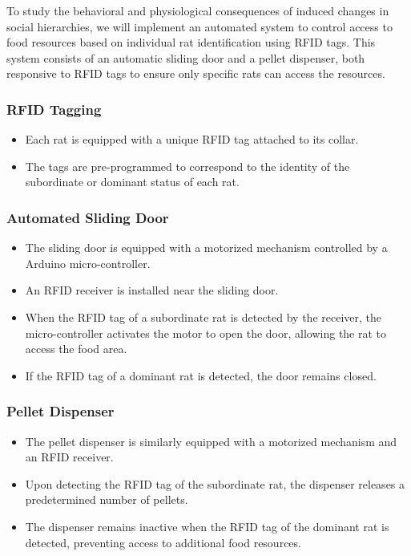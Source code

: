 \documentclass[english, a4paper, 11pt]{article}
\begin{document}
To study the behavioral and physiological consequences of induced changes in social hierarchies, we will implement an automated system to control access to food resources based on individual rat identification using RFID tags\cite{habedankMouseWhereArt2020}. This system consists of an automatic sliding door and a pellet dispenser, both responsive to RFID tags to ensure only specific rats can access the resources.

\subsubsection*{RFID Tagging}
\begin{itemize}
    \item Each rat is equipped with a unique RFID tag attached to its collar.
    \item The tags are pre-programmed to correspond to the identity of the subordinate or dominant status of each rat.
\end{itemize}

\subsubsection*{Automated Sliding Door}
\begin{itemize}
    \item The sliding door is equipped with a motorized mechanism controlled by a Arduino micro-controller.
    \item An RFID receiver is installed near the sliding door.
    \item When the RFID tag of a subordinate rat is detected by the receiver, the micro-controller activates the motor to open the door, allowing the rat to access the food area.
    \item If the RFID tag of a dominant rat is detected, the door remains closed.
\end{itemize}

\subsubsection*{Pellet Dispenser}
\begin{itemize}
    \item The pellet dispenser is similarly equipped with a motorized mechanism and an RFID receiver.
    \item Upon detecting the RFID tag of the subordinate rat, the dispenser releases a predetermined number of pellets.
    \item The dispenser remains inactive when the RFID tag of the dominant rat is detected, preventing access to additional food resources.
\end{itemize}
\end{document}
